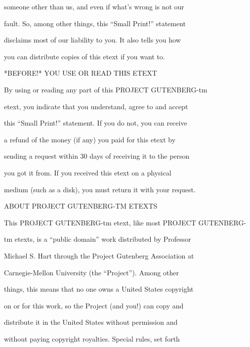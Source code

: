 \documentclass[12pt]{book}
\begin{document}
someone other than us, and even if what's wrong is not our

fault.  So, among other things, this ``Small Print!'' statement

disclaims most of our liability to you.  It also tells you how

you can distribute copies of this etext if you want to.



\begin{center}

*BEFORE!* YOU USE OR READ THIS ETEXT

\end{center}



By using or reading any part of this PROJECT GUTENBERG-tm

etext, you indicate that you understand, agree to and accept

this ``Small Print!'' statement.  If you do not, you can receive

a refund of the money (if any) you paid for this etext by

sending a request within 30 days of receiving it to the person

you got it from.  If you received this etext on a physical

medium (such as a disk), you must return it with your request.



\begin{center}

ABOUT PROJECT GUTENBERG-TM ETEXTS

\end{center}



This PROJECT GUTENBERG-tm etext, like most PROJECT GUTEN\-BERG-

tm etexts, is a ``public domain'' work distributed by Professor

Michael S. Hart through the Project Gutenberg Association at

Carnegie-Mellon University (the ``Project'').  Among other

things, this means that no one owns a United States copyright

on or for this work, so the Project (and you!) can copy and

distribute it in the United States without permission and

without paying copyright royalties.  Special rules, set forth
\end{document}
